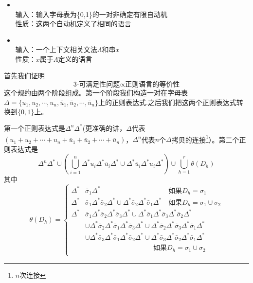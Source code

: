 \documentclass[twocolumn]{article}
\theoremstyle{nonumberplain}%
\begin{document}
\begin{CJK}{UTF8}{gbsn}
\begin{itemize}
      \item {}\\
          输入：输入字母表为\{0,1\}的一对非确定有限自动机\\
          性质：这两个自动机定义了相同的语言

      \item {}\\
      输入：一个上下文相关文法$\Lambda$和串$x$\\
      性质：$x$属于$\Lambda$定义的语言
    \end{itemize}

    首先我们证明$$\text{3-可满足性问题}\propto\text{正则语言的等价性}$$这个规约由两个阶段组成。第一个阶段我们构造一对在字母表$\Delta=\{u_1,u_2,\cdots,u_n,\bar{u}_1,\bar{u}_2,\cdots,\bar{u}_n\}$上的正则表达式.之后我们把这两个正则表达式转换到$\{0,1\}$上。

    第一个正则表达式是$\Delta^n\Delta^*$(更准确的讲，$\Delta$代表$(u_1+u_2+\cdots+u_n+\bar{u}_1+\bar{u}_2+\cdots+\bar{u}_n)$，$\Delta^n$代表$n$个$\Delta$拷贝的连接\footnote{$n$次连接}）。第二个正则表达式是
    $$\Delta^n\Delta^*\cup\left(\bigcup_{i=1}^{n}\Delta^*u_i\Delta^*\bar{u}_i\Delta^* \cup \Delta^*\bar{u}_i\Delta^*u_i\Delta^*\right)\cup\bigcup_{h=1}^{r}\theta(D_h)$$
    其中
    \begin{equation}\nonumber
      \theta(D_h)=\left\{
      \begin{aligned}
        \Delta^*&\bar{\sigma}_1\Delta^*  \qquad \qquad \qquad \qquad \qquad \text{如果}D_h=\sigma_1\\
        \Delta^*&\bar{\sigma}_1\Delta^*\bar{\sigma}_2\Delta^*
            \cup \Delta^*\bar{\sigma}_2\Delta^*\bar{\sigma}_1\Delta^* \quad \text{如果}D_h=\sigma_1\cup\sigma_2\\
        \Delta^*&\bar{\sigma}_1\Delta^*\bar{\sigma}_2\Delta^*\bar{\sigma}_3\Delta^*
            \cup \Delta^*\bar{\sigma}_1\Delta^*\bar{\sigma}_3\Delta^*\bar{\sigma}_2\Delta^* \\
            &\cup\Delta^*\bar{\sigma}_2\Delta^*\bar{\sigma}_1\Delta^*\bar{\sigma}_3\Delta^*
                \cup \Delta^*\bar{\sigma}_2\Delta^*\bar{\sigma}_3\Delta^*\bar{\sigma}_1\Delta^* \\
            &\cup\Delta^*\bar{\sigma}_3\Delta^*\bar{\sigma}_1\Delta^*\bar{\sigma}_2\Delta^*
                \cup \Delta^*\bar{\sigma}_3\Delta^*\bar{\sigma}_2\Delta^*\bar{\sigma}_1\Delta^* \\
        & \qquad \qquad \qquad \qquad \qquad \text{如果}D_h=\sigma_1\cup\sigma_2\\
      \end{aligned}
      \right.
    \end{equation}


\end{CJK}
\end{document}
